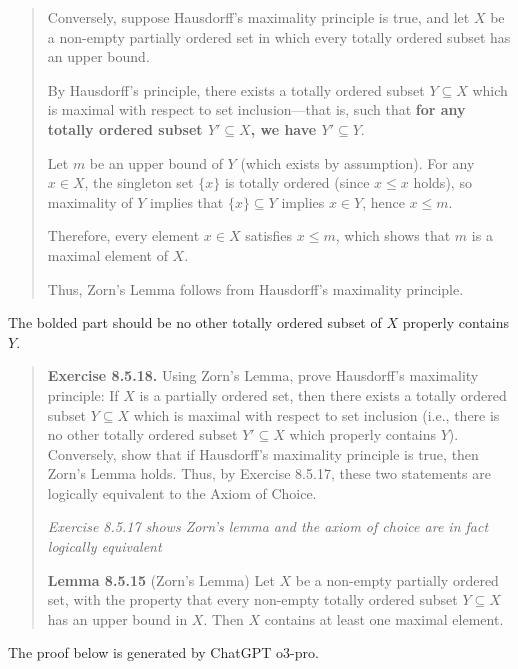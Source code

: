 \documentclass{article}
\begin{document}
\begin{quotation}
    Conversely, suppose Hausdorff's maximality principle is true, and let $X$ be a
    non-empty partially ordered set in which every totally ordered subset has an
    upper bound.

    By Hausdorff's principle, there exists a totally ordered subset
    $Y \subseteq X$ which is maximal with respect to set inclusion—that is,
    such that \textbf{for any totally ordered subset $Y' \subseteq X$, we have $Y' \subseteq Y$}.

    Let $m$ be an upper bound of $Y$ (which exists by assumption). For any
    $x \in X$, the singleton set $\{x\}$ is totally ordered (since $x \leq x$ holds),
    so maximality of $Y$ implies that $\{x\} \subseteq Y$ implies $x \in Y$, hence
    $x \leq m$.

    Therefore, every element $x \in X$ satisfies $x \leq m$, which shows that
    $m$ is a maximal element of $X$.

    Thus, Zorn's Lemma follows from Hausdorff's maximality principle.
\end{quotation}

The bolded part should be no other totally ordered subset of $X$ properly contains $Y$.

\begin{quotation}
    \textbf{Exercise 8.5.18.} Using Zorn's Lemma, prove Hausdorff's maximality principle:
    If $X$ is a partially ordered set, then there exists a totally ordered subset
    $Y \subseteq X$ which is maximal with respect to set inclusion (i.e., there is no other
    totally ordered subset $Y' \subseteq X$ which properly contains $Y$).
    Conversely, show that if Hausdorff's maximality principle is true, then Zorn's Lemma holds.
    Thus, by Exercise 8.5.17, these two statements are logically equivalent to the Axiom of Choice.

    \textit{Exercise 8.5.17 shows Zorn's lemma and the axiom of choice are in fact logically equivalent}

    \textbf{Lemma 8.5.15} (Zorn's Lemma) Let $X$ be a non-empty partially ordered set,
    with the property that every non-empty totally ordered subset $Y \subseteq X$
    has an upper bound in $X$. Then $X$ contains at least one maximal element.
\end{quotation}

The proof below is generated by ChatGPT o3-pro.
\end{document}
